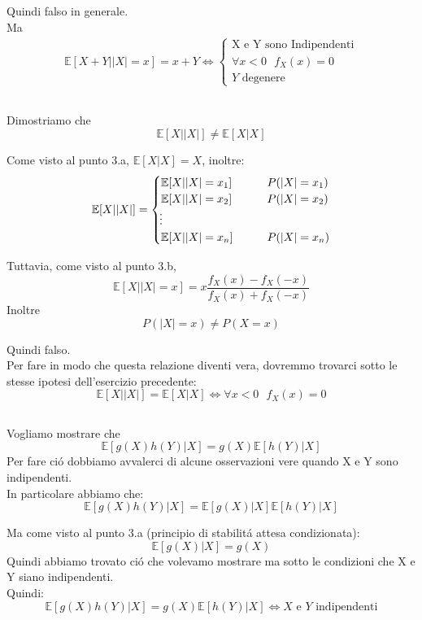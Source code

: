 \documentclass[a4paper]{article}
\newcommand{\E}[0]{\mathbb{E}}
\begin{document}
Quindi falso in generale. \\
Ma 
\begin{align*}
\E[X + Y | |X| = x] = x + Y \iff
	\begin{cases}
        \text{X e Y sono Indipendenti} \\
        \forall x < 0  \ \ \  f_X(x) = 0 \\
        Y \text{ degenere}
	\end{cases}
\end{align*}


\subsection{}
Dimostriamo che 
$$
\E[X||X|] \ne \E[X | X] 
$$

Come visto al punto 3.a,  $\E[X | X] = X$, inoltre:
\begin{align}
	\E[X | |X|]=
	\begin{cases}
		\E[X | |X| = x_1] \qquad & P(|X|=x_1)\\
		\E[X | |X| = x_2] \qquad & P(|X|=x_2)\\
        \vdotswithin{} \notag \\
		\E[X | |X| = x_n] \qquad & P(|X|=x_n)\\
	\end{cases}
\end{align}

Tuttavia, come visto al punto 3.b, 
$$\E[X | |X| = x] = x\frac{f_X(x)-f_X(-x)}{f_X(x) + f_X(-x)}$$
Inoltre
$$P(|X| = x) \ne P(X = x)$$

Quindi falso. \\ 
Per fare in modo che questa relazione diventi vera, dovremmo trovarci sotto le stesse ipotesi dell'esercizio precedente:
$$
\E[X||X|] = \E[X | X] \iff \forall x<0 \ \ \ f_X(x) = 0
$$

\subsection{}
Vogliamo mostrare che
$$\E[g(X)h(Y) | X] = g(X)\E[h(Y) | X]$$
Per fare ció dobbiamo avvalerci di alcune osservazioni vere quando X e Y sono indipendenti.\\
In particolare abbiamo che:
$$\E[g(X)h(Y) | X] = \E[g(X) | X] \E[h(Y) | X]$$

Ma come visto al punto 3.a (principio di stabilitá attesa condizionata):
$$
\E[g(X) | X] = g(X)
$$
Quindi abbiamo trovato ció che volevamo mostrare ma sotto le condizioni che X e Y siano indipendenti. \\
Quindi:
$$
\E[g(X)h(Y) | X] = g(X)\E[h(Y) | X] \iff X \text{ e } Y \text{ indipendenti}
$$
\end{document}

